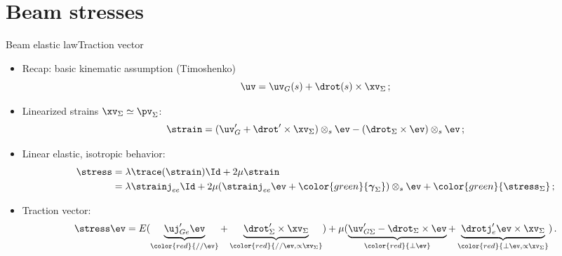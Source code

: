 \section{Beam stresses}

\begin{frame}{Beam elastic law}{Traction vector}

\begin{itemize}
\item Recap: basic kinematic assumption (Timoshenko)
\begin{displaymath}
\uv=\uv_G(s)+\drot(s)\times\xv_\Sigma\,;
\end{displaymath}
\item Linearized strains $\xv_\Sigma\simeq\pv_\Sigma$:
\begin{displaymath}
\strain=(\uv_G'+\drot'\times\xv_\Sigma)\otimes_s\ev-(\drot_\Sigma\times\ev)\otimes_s\ev\,;
\end{displaymath}
\item Linear elastic, isotropic behavior:
\begin{displaymath}
\begin{split}
\stress &=\lambda\trace(\strain)\Id+2\mu\strain \\
&=\lambda\strainj_{ee}\Id+2\mu(\strainj_{ee}\ev+{\color{green}{{\boldsymbol\gamma}_\Sigma}})\otimes_s\ev+{\color{green}{\stress_\Sigma}}\,;
\end{split}
\end{displaymath}
\item Traction vector:
\begin{displaymath}
\stress\ev=E(\underbrace{\uj_{Ge}'\ev}_{\color{red}{//\ev}}+\underbrace{\drot_\Sigma'\times\xv_\Sigma}_{\color{red}{//\ev,\propto\xv_\Sigma}})+\mu(\underbrace{\uv_{G\Sigma}'-\drot_\Sigma\times\ev}_{\color{red}{\perp\ev}}+\underbrace{\drotj_e'\ev\times\xv_\Sigma}_{\color{red}{\perp\ev,\propto\xv_\Sigma}})\,.
\end{displaymath}
\end{itemize}

\end{frame}

